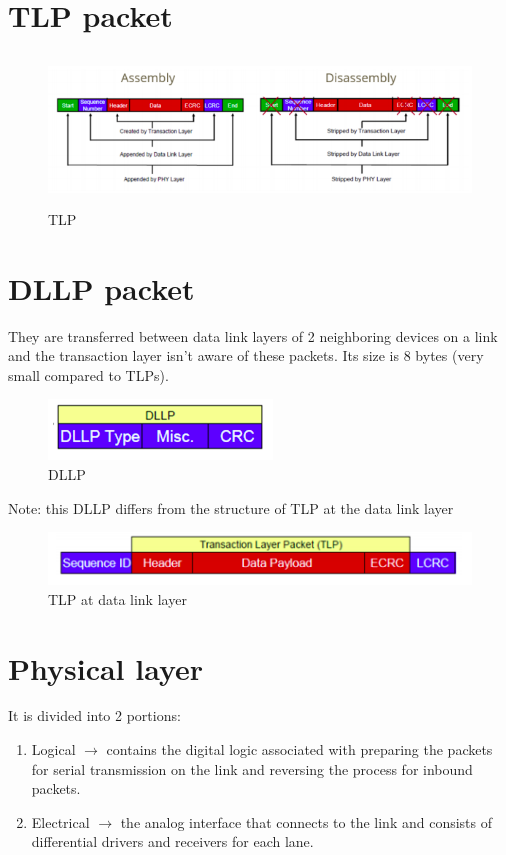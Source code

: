 \section{TLP packet}
\begin{figure}[H]
  \centering
  \includegraphics[width=160mm,height=40mm]{images/TLP.png}
  \caption{TLP}
  \label{lane}
\end{figure}
\section{DLLP packet}
They are transferred between data link layers of 2 neighboring devices on a link and the
transaction layer isn’t aware of these packets. Its size is 8 bytes (very small compared to
TLPs).
\begin{figure}[H]
  \centering
  \includegraphics{images/DLLP.png}
  \caption{DLLP}
  \label{lane}
\end{figure}
Note: this DLLP differs from the structure of TLP at the data link layer 

\begin{figure}[H]
  \centering
  \includegraphics{images/TLP_link_layer.png}
  \caption{TLP at data link layer}
  \label{lane}
\end{figure}

\section{Physical layer}
It is divided into 2 portions:
\begin{enumerate}
    \item Logical $\longrightarrow$  contains the digital logic associated with preparing the packets for
serial transmission on the link and reversing the process for inbound packets.
\item Electrical  $\longrightarrow$ the analog interface that connects to the link and consists of
differential drivers and receivers for each lane.
\end{enumerate}

